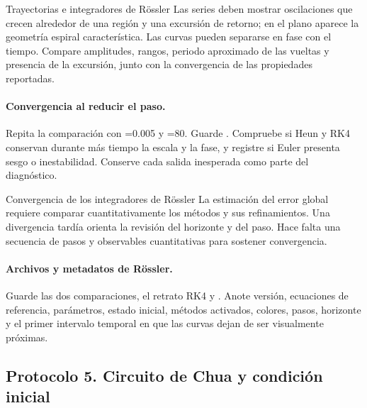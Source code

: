 \begin{cajaverde}{Trayectorias e integradores de Rössler}
Las series deben mostrar oscilaciones que crecen alrededor de una región y una
excursión de retorno; en el plano aparece la geometría espiral característica.
Las curvas pueden separarse en fase con el tiempo. Compare amplitudes, rangos,
periodo aproximado de las vueltas y presencia de la excursión, junto con
la convergencia de las propiedades reportadas.
\end{cajaverde}


\paragraph{Convergencia al reducir el paso.}
Repita la comparación con =0.005 y =80.
Guarde . Compruebe si Heun y RK4
conservan durante más tiempo la escala y la fase, y registre si Euler presenta
sesgo o inestabilidad. Conserve cada salida inesperada como parte del
diagnóstico.

\begin{cajaalerta}{Convergencia de los integradores de Rössler}
La estimación del error global requiere comparar cuantitativamente los métodos y sus
refinamientos. Una divergencia tardía orienta la revisión del horizonte y del paso. Hace falta
una secuencia de pasos y observables cuantitativas para sostener convergencia.
\end{cajaalerta}

\paragraph{Archivos y metadatos de Rössler.}
Guarde las dos comparaciones, el retrato RK4 y
. Anote versión, ecuaciones de referencia,
parámetros, estado inicial, métodos activados, colores, pasos, horizonte y el
primer intervalo temporal en que las curvas dejan de ser visualmente próximas.

\subsection{Protocolo 5. Circuito de Chua y condición inicial}

